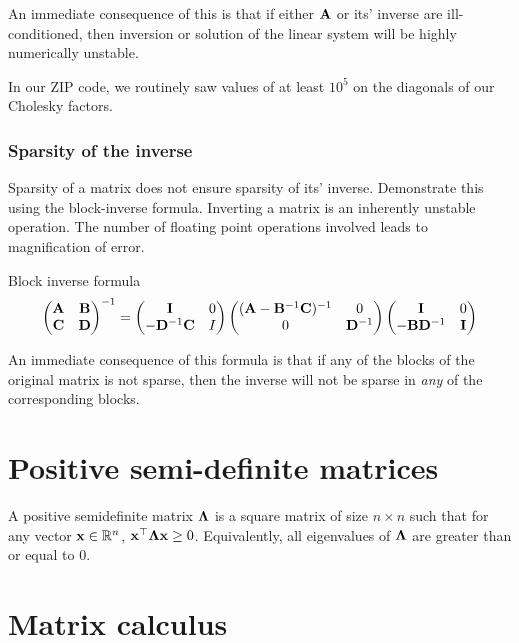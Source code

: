 \documentclass{amsart}[12pt]
\begin{document}
An immediate consequence of this is that if either ${\bf A}$ or its' inverse are ill-conditioned, then inversion
or solution of the linear system will be highly numerically unstable.

In our ZIP code, we routinely saw values of at least $10^5$ on the diagonals of our Cholesky factors.

\subsubsection{Sparsity of the inverse}
Sparsity of a matrix does not ensure sparsity of its' inverse. Demonstrate this using
the block-inverse formula. Inverting a matrix is an inherently unstable operation. The number of floating
point operations involved leads to magnification of error.

Block inverse formula \\
\[
	\begin{pmatrix}
	{\bf A} & {\bf B} \\
	{\bf C} & {\bf D}
	\end{pmatrix}^{-1}
	=
	\begin{pmatrix}
	{\bf I} & 0 \\
	-{\bf D}^{-1} {\bf C} & I
	\end{pmatrix}
	\begin{pmatrix}
	({\bf A} - {\bf B}^{-1}{\bf C})^{-1} & 0 \\
	0 & {\bf D}^{-1}
	\end{pmatrix}
	\begin{pmatrix}
	{\bf I} & 0 \\
	-{\bf B}{\bf D}^{-1} & {\bf I}
	\end{pmatrix}
\]

An immediate consequence of this formula is that if any of the blocks of the original matrix is not sparse,
then the inverse will not be sparse in \emph{any} of the corresponding blocks.

\section{Positive semi-definite matrices}
A positive semidefinite matrix ${\boldsymbol \Lambda}$ is a square matrix of size $n \times n$ such that for any vector
${\bf x} \in {\mathbb{R}}^n$, ${\bf x}^\top {\boldsymbol\Lambda} {\bf x} \geq 0$. Equivalently, all eigenvalues of ${\boldsymbol \Lambda}$ are greater than or 
equal to 0.

\section{Matrix calculus}
\end{document}
